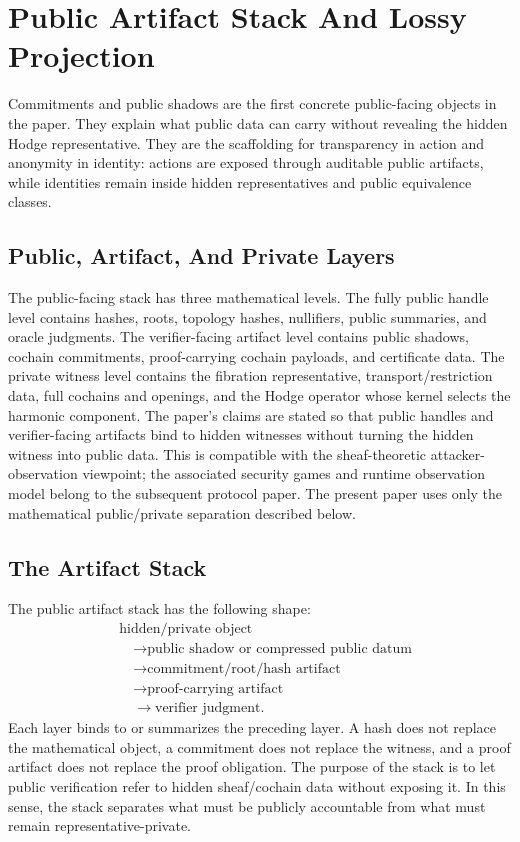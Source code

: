 \section{Public Artifact Stack And Lossy Projection}\label{sec:public-artifact-stack}

Commitments and public shadows are the first concrete public-facing objects in
the paper. They explain what public data can carry without revealing the hidden
Hodge representative.
They are the scaffolding for transparency in action and anonymity in identity:
actions are exposed through auditable public artifacts, while identities remain
inside hidden representatives and public equivalence classes.

\subsection{Public, Artifact, And Private Layers}

The public-facing stack has three mathematical levels. The fully public handle
level contains hashes, roots, topology hashes, nullifiers, public summaries, and
oracle judgments. The verifier-facing artifact level contains public shadows,
cochain commitments, proof-carrying cochain payloads, and certificate data. The
private witness level contains the fibration representative,
transport/restriction data, full cochains and openings, and the Hodge operator
whose kernel selects the harmonic component. The paper's claims are stated so
that public handles and verifier-facing artifacts bind to hidden witnesses
without turning the hidden witness into public data. This is compatible with the
sheaf-theoretic attacker-observation viewpoint; the associated security games
and runtime observation model belong to the subsequent protocol paper. The
present paper uses only the mathematical public/private separation described
below.

\subsection{The Artifact Stack}

The public artifact stack has the following shape:
\[
\begin{aligned}
  &\text{hidden/private object} \\
  &\quad\to \text{public shadow or compressed public datum} \\
  &\quad\to \text{commitment/root/hash artifact} \\
  &\quad\to \text{proof-carrying artifact} \\
  &\quad\to \text{verifier judgment}.
\end{aligned}
\]
Each layer binds to or summarizes the preceding layer. A hash does not replace
the mathematical object, a commitment does not replace the witness, and a proof
artifact does not replace the proof obligation. The purpose of the stack is to
let public verification refer to hidden sheaf/cochain data without exposing it.
In this sense, the stack separates what must be publicly accountable from what
must remain representative-private.

